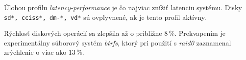 Úlohou profilu \emph{latency-performance} je čo najviac znížiť latenciu
systému. Disky \texttt{sd*, cciss*, dm-*, vd*} sú ovplyvnené, ak je tento
profil aktívny. 

Rýchlosť diskových operácií sa zlepšila až o približne 8\,\%. Prekvapením je
experimentálny súborový systém \emph{btrfs}, ktorý pri použití s \emph{raid0}
zaznamenal zrýchlenie o viac ako 13\,\%.
